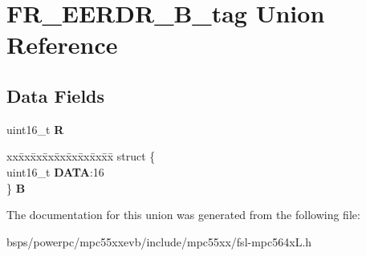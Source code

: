 \hypertarget{unionFR__EERDR__16B__tag}{}\section{F\+R\+\_\+\+E\+E\+R\+D\+R\+\_\+B\+\_\+tag Union Reference}
\label{unionFR__EERDR__16B__tag}
\subsection*{Data Fields}
\begin{DoxyCompactItemize}
\item 
\mbox{\label{unionFR__EERDR__16B__tag_a86300f5898b805d4e4d03cab6d405270}} 
uint16\+\_\+t {\bfseries R}
\item 
\mbox{\label{unionFR__EERDR__16B__tag_ab881033b70af7f2cbe66aea0457677ca}} 
\begin{tabbing}
xx\=xx\=xx\=xx\=xx\=xx\=xx\=xx\=xx\=\kill
struct \{\\
\>uint16\_t {\bfseries DATA}:16\\
\} {\bfseries B}\\

\end{tabbing}\end{DoxyCompactItemize}


The documentation for this union was generated from the following file\+:\begin{DoxyCompactItemize}
\item 
bsps/powerpc/mpc55xxevb/include/mpc55xx/fsl-\/mpc564x\+L.\+h\end{DoxyCompactItemize}

